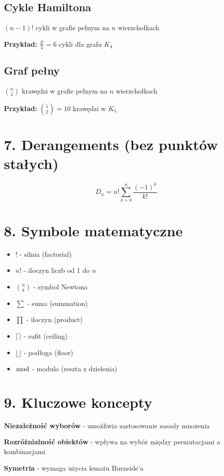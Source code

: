 \documentclass[10pt,a4paper]{article}
\begin{document}
\begin{multicols}{2}
\subsection*{Cykle Hamiltona}
$(n-1)!$ cykli w grafie pełnym na $n$ wierzchołkach

\textbf{Przykład:} $\frac{4!}{4} = 6$ cykli dla grafu $K_4$

\subsection*{Graf pełny}
$\binom{n}{2}$ krawędzi w grafie pełnym na $n$ wierzchołkach

\textbf{Przykład:} $\binom{5}{2} = 10$ krawędzi w $K_5$

\section*{7. Derangements (bez punktów stałych)}

$$D_n = n! \sum_{k=0}^n \frac{(-1)^k}{k!}$$

\section*{8. Symbole matematyczne}

\begin{itemize}
\item $!$ - silnia (factorial)
\item $n!$ - iloczyn liczb od 1 do $n$
\item $\binom{n}{k}$ - symbol Newtona
\item $\sum$ - suma (summation)
\item $\prod$ - iloczyn (product)
\item $\lceil \rceil$ - sufit (ceiling)
\item $\lfloor \rfloor$ - podłoga (floor)
\item $\bmod$ - modulo (reszta z dzielenia)
\end{itemize}

\section*{9. Kluczowe koncepty}

\textbf{Niezależność wyborów} - umożliwia zastosowanie zasady mnożenia

\textbf{Rozróżnialność obiektów} - wpływa na wybór między permutacjami a kombinacjami

\textbf{Symetria} - wymaga użycia lematu Burnside'a


\end{multicols}
\end{document}
